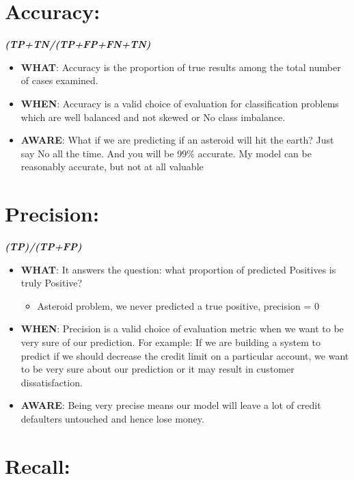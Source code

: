 \documentclass[
]{book}
\providecommand{\tightlist}{%
  \setlength{\itemsep}{0pt}\setlength{\parskip}{0pt}}
\begin{document}
\hypertarget{accuracy-8}{%
\section{Accuracy:}\label{accuracy-8}}

\textbf{\emph{(TP+TN/(TP+FP+FN+TN)}}

\begin{itemize}
\item
  \textbf{WHAT}: Accuracy is the proportion of true results among the total number of cases examined.
\item
  \textbf{WHEN}: Accuracy is a valid choice of evaluation for classification problems which are well balanced and not skewed or No class imbalance.
\item
  \textbf{AWARE}: What if we are predicting if an asteroid will hit the earth? Just say No all the time. And you will be 99\% accurate. My model can be reasonably accurate, but not at all valuable
\end{itemize}

\hypertarget{precision-8}{%
\section{Precision:}\label{precision-8}}

\textbf{\emph{(TP)/(TP+FP)}}

\begin{itemize}
\item
  \textbf{WHAT}: It answers the question: what proportion of predicted Positives is truly Positive?

  \begin{itemize}
  \tightlist
  \item
    Asteroid problem, we never predicted a true positive, precision = 0
  \end{itemize}
\item
  \textbf{WHEN}: Precision is a valid choice of evaluation metric when we want to be very sure of our prediction. For example: If we are building a system to predict if we should decrease the credit limit on a particular account, we want to be very sure about our prediction or it may result in customer dissatisfaction.
\item
  \textbf{AWARE}: Being very precise means our model will leave a lot of credit defaulters untouched and hence lose money.
\end{itemize}

\hypertarget{recall-8}{%
\section{Recall:}\label{recall-8}}
\end{document}
